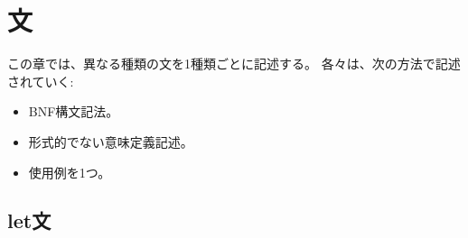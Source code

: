 \documentclass[\pformat,12pt]{jarticle}
\begin{document}
\section{文}\label{sec:stmt}

この章では、異なる種類の文を1種類ごとに記述する。 
各々は、次の方法で記述されていく:
\begin{itemize}
\item BNF構文記法。
\item 形式的でない意味定義記述。
\item 使用例を1つ。
\end{itemize}

\subsection{let文}\label{letstmt}
\end{document}
